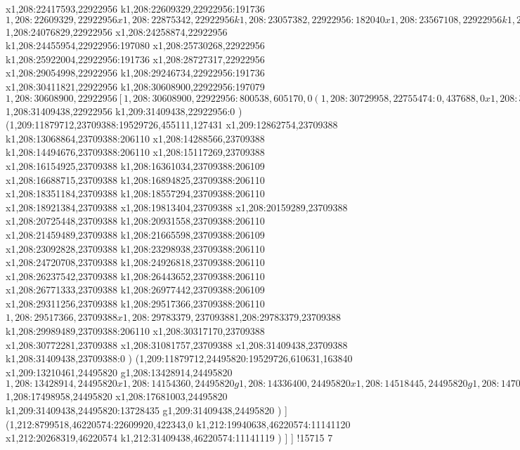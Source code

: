 {x1,208:22417593,22922956
k1,208:22609329,22922956:191736
$1,208:22609329,22922956
x1,208:22875342,22922956
k1,208:23057382,22922956:182040
x1,208:23567108,22922956
k1,208:23749148,22922956:182040
x1,208:24076829,22922956
$1,208:24076829,22922956
x1,208:24258874,22922956
k1,208:24455954,22922956:197080
x1,208:25730268,22922956
k1,208:25922004,22922956:191736
x1,208:28727317,22922956
x1,208:29054998,22922956
k1,208:29246734,22922956:191736
x1,208:30411821,22922956
k1,208:30608900,22922956:197079
$1,208:30608900,22922956
[1,208:30608900,22922956:800538,605170,0
(1,208:30729958,22755474:0,437688,0
x1,208:31057639,22755474
)
(1,208:30608900,22922956:800538,519994,0
x1,208:31178696,22922956
(1,208:31178696,22685131:230742,282169,0
x1,208:31376670,22685131
)
)
]
$1,208:31409438,22922956
k1,209:31409438,22922956:0
)
(1,209:11879712,23709388:19529726,455111,127431
x1,209:12862754,23709388
k1,208:13068864,23709388:206110
x1,208:14288566,23709388
k1,208:14494676,23709388:206110
x1,208:15117269,23709388
x1,208:16154925,23709388
k1,208:16361034,23709388:206109
x1,208:16688715,23709388
k1,208:16894825,23709388:206110
x1,208:18351184,23709388
k1,208:18557294,23709388:206110
x1,208:18921384,23709388
x1,208:19813404,23709388
x1,208:20159289,23709388
x1,208:20725448,23709388
k1,208:20931558,23709388:206110
x1,208:21459489,23709388
k1,208:21665598,23709388:206109
x1,208:23092828,23709388
k1,208:23298938,23709388:206110
x1,208:24720708,23709388
k1,208:24926818,23709388:206110
x1,208:26237542,23709388
k1,208:26443652,23709388:206110
x1,208:26771333,23709388
k1,208:26977442,23709388:206109
x1,208:29311256,23709388
k1,208:29517366,23709388:206110
$1,208:29517366,23709388
x1,208:29783379,23709388
$1,208:29783379,23709388
k1,208:29989489,23709388:206110
x1,208:30317170,23709388
x1,208:30772281,23709388
x1,208:31081757,23709388
x1,208:31409438,23709388
k1,208:31409438,23709388:0
)
(1,209:11879712,24495820:19529726,610631,163840
x1,209:13210461,24495820
g1,208:13428914,24495820
$1,208:13428914,24495820
x1,208:14154360,24495820
g1,208:14336400,24495820
x1,208:14518445,24495820
g1,208:14700485,24495820
[1,208:14700485,24495820:361814,610631,0
(1,208:14717552,24322877:0,437688,0
x1,208:15045233,24322877
)
(1,208:14700485,24495820:361814,455111,0
x1,208:15041668,24495820
)
]
x1,208:15969790,24495820
g1,208:16151830,24495820
x1,208:16661556,24495820
g1,208:16843596,24495820
x1,208:17498958,24495820
$1,208:17498958,24495820
x1,208:17681003,24495820
k1,209:31409438,24495820:13728435
g1,209:31409438,24495820
)
]
(1,212:8799518,46220574:22609920,422343,0
k1,212:19940638,46220574:11141120
x1,212:20268319,46220574
k1,212:31409438,46220574:11141119
)
]
]
!15715
}7
